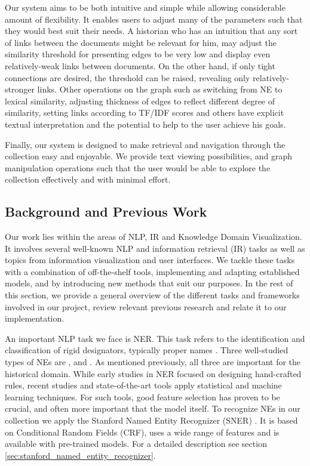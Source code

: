 Our system aims to be both intuitive and simple while allowing considerable amount of flexibility. It enables users to adjust many of the 
parameters such that they would best suit their needs. A historian who has an intuition that any sort of links between the documents might 
be relevant for him, may adjust the similarity threshold for presenting edges to be very low and display even relatively-weak links between documents. On the other hand, if only tight connections 
are desired, the threshold can be raised, revealing only relatively-stronger links. Other operations on the graph such as switching from NE to lexical similarity, adjusting 
thickness of edges to reflect different degree of similarity, setting links according to TF/IDF scores and others have explicit textual 
interpretation and the potential to help to the user achieve his goals. 

Finally, our system is designed to make retrieval and navigation through the collection easy and enjoyable. We provide text viewing 
possibilities, and graph manipulation operations such that the user would be able to explore the collection effectively and with minimal effort.

\subsection {Background and Previous Work}
\label{sec:nlp_background}

Our work lies within the areas of NLP, IR and Knowledge Domain Visualization.
It involves several well-known NLP and information retrieval (IR) tasks as well as topics from information visualization and user interfaces. 
We tackle these tasks with a combination of off-the-shelf tools, implementing and adapting established models, and by introducing new methods 
that suit our purposes. In the rest of this section, we provide a general overview of the different tasks and frameworks involved in our 
project, review relevant previous research and relate it to our implementation. 

An important NLP task we face is NER. This task refers to the identification and classification of rigid designators, 
typically proper names \cite{NEsurvey2009}. Three well-studied types of NEs are ,  and . 
As mentioned previously, all three are important for the historical domain. While early studies in NER focused on designing 
hand-crafted rules, recent studies and state-of-the-art tools apply statistical and machine learning techniques. For such tools, 
good feature selection has proven to be crucial, and often more important that the model itself.  
To recognize NEs in our collection we apply the Stanford Named Entity Recognizer (SNER) \cite{sner}. It is based on Conditional Random Fields (CRF), 
uses a wide range of features and is available with pre-trained models.  For a detailed description see section \ref{sec:stanford_named_entity_recognizer}.

